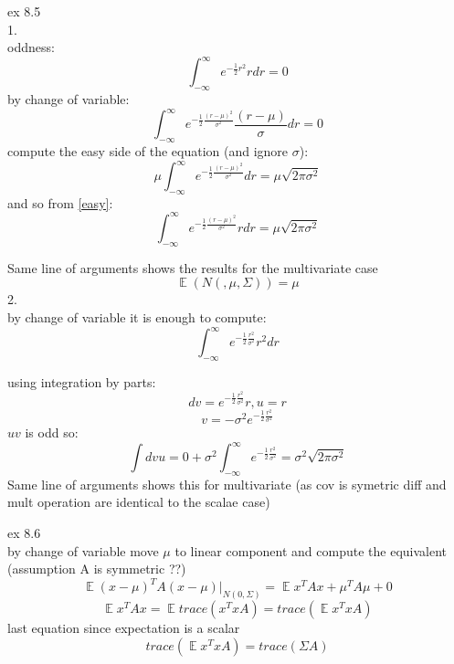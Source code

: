 \documentclass[20pt]{extarticle}
\DeclareMathOperator{\E}{\mathbb{E}}
\begin{document}
ex 8.5\\ 
1.\\
oddness:\\
\begin{equation}
\int_{-\infty}^{\infty}e^{-\frac{1}{2}r^2}rdr = 0
\end{equation}
by change of variable:\\
\begin{equation}
\int_{-\infty}^{\infty}e^{-\frac{1}{2}\frac{(r-\mu)^2}{\sigma^2}}\frac{(r-\mu)}{\sigma}dr = 0
\end{equation} 
compute the easy side of the equation (and ignore $\sigma$):\\
\begin{equation}\label{easy}
\mu\int_{-\infty}^{\infty}e^{-\frac{1}{2}\frac{(r-\mu)^2}{\sigma^2}}dr = \mu\sqrt{2\pi\sigma^2}
\end{equation}
and so from \ref{easy}:\\
\begin{equation}
\int_{-\infty}^{\infty}e^{-\frac{1}{2}\frac{(r-\mu)^2}{\sigma^2}}rdr = \mu\sqrt{2\pi\sigma^2}
\end{equation} 


Same line of arguments shows the results for the multivariate case
$$\E(N(,\mu,\Sigma)) = \mu$$
2. \\
by change of variable it is enough to compute:\\
$$\int_{-\infty}^{\infty}e^{-\frac{1}{2}\frac{r^2}{\sigma^2}}r^2dr $$

using integration by parts: \\
$$dv = e^{-\frac{1}{2}\frac{r^2}{\sigma^2}}r , u = r$$
$$ v = -\sigma^2 e^{-\frac{1}{2}\frac{r^2}{\sigma^2}}$$
$uv$ is odd so:\\

$$\int dvu= 0 + \sigma^2 \int_{-\infty}^{\infty}e^{-\frac{1}{2}\frac{r^2}{\sigma^2}} = \sigma^2 \sqrt{2\pi\sigma^2}$$
Same line of arguments shows this for multivariate (as cov is symetric diff and mult operation are identical to the scalae case)

ex 8.6\\
by change of variable move $\mu$ to linear component and compute the equivalent\\
(assumption A is symmetric ??)\\
$$\E(x-\mu)^TA(x-\mu)|_{N(0,\Sigma)} = \E x^{T}Ax + \mu^TA\mu + 0$$
$$\E x^{T}Ax = \E trace(x^{T}xA) = trace(\E x^{T}xA) $$
last equation since expectation is a scalar\\
$$trace(\E x^{T}xA) = trace(\Sigma A)$$
\end{document}
